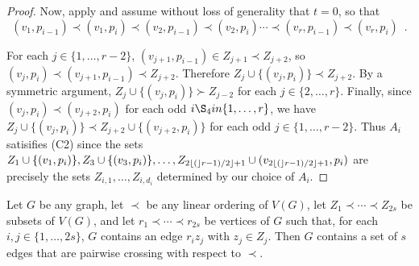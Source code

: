 \documentclass[kpfonts]{patmorin}
\begin{document}
\begin{proof}
	Now, apply  and assume without loss of generality that $t=0$, so that
	\[
		(v_1,p_{i-1})\prec (v_1,p_{i}) \prec (v_2,p_{i-1}) \prec (v_2,p_{i}) \cdots \prec (v_r,p_{i-1}) \prec (v_r,p_{i}) \enspace .
	\]

    For each $j\in\{1,\ldots,r-2\}$, $(v_{j+1},p_{i-1})\in Z_{j+1}\prec Z_{j+2}$, so  $(v_j,p_i)\prec (v_{j+1},p_{i-1}) \prec Z_{j+2}$.  Therefore $Z_j\cup\{(v_j,p_i)\} \prec Z_{j+2}$.  By a symmetric argument, $Z_j\cup\{(v_j,p_i)\} \succ Z_{j-2}$ for each  $j\in\{2,\ldots,r\}$.  Finally, since $(v_{j},p_i)\prec (v_{j+2},p_i)$ for each odd $i\S_4in\{1,\ldots,r\}$, we have $Z_{j}\cup\{(v_j,p_i)\} \prec Z_{j+2}\cup\{(v_{j+2},p_i)\}$ for each odd $j\in\{1,\ldots,r-2\}$.  Thus $A_i$ satisifies (C2) since the sets $Z_1\cup\{(v_1,p_i)\},Z_3\cup\{(v_3,p_i)\},\ldots,Z_{2{\lfloor ( \rfloor}r-1)/2\rfloor+1} \cup (v_{2{\lfloor ( \rfloor}r-1)/2\rfloor+1},p_i)$ are precisely the sets $Z_{i,1},\ldots,Z_{i,d_i}$ determined by our choice of $A_i$.
\end{proof}

\begin{lem}
    Let $G$ be any graph, let $\prec$ be any linear ordering of $V(G)$,  let $Z_{1}\prec\cdots\prec Z_{2s}$ be subsets of $V(G)$, and let $r_1\prec\cdots\prec r_{2s}$ be vertices of $G$ such that, for each $i,j\in\{1,\ldots,2s\}$, $G$ contains an edge $r_iz_j$ with $z_j\in Z_j$. Then $G$ contains a set of $s$ edges that are pairwise crossing with respect to $\prec$.
\end{lem}
\end{document}
